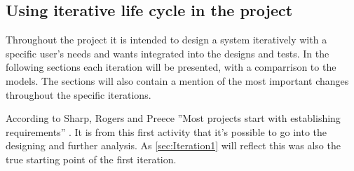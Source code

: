 \subsection{Using iterative life cycle in the project}
Throughout the project it is intended to design a system iteratively with a specific user’s needs and wants integrated into the designs and tests. 
In the following sections each iteration will be presented, with a comparrison to the models.
The sections will also contain a mention of the most important changes throughout the specific iterations. 

According to Sharp, Rogers and Preece ''Most projects start with establishing requirements'' \citep[p.~333]{InteractionDesign}. 
It is from this first activity that it’s possible to go into the designing and further analysis.
As \cref{sec:Iteration1} will reflect this was also the true starting point of the first iteration.